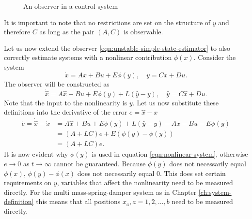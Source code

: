 \begin{figure}[ht]
    \centering
    \caption{An observer in a control system}
    \label{fig:observer-diagram}
\end{figure}

It is important to note that no restrictions are set on the structure of $y$ and therefore $C$ as long as the pair $(A,C)$ is observable. 

Let us now extend the observer \eqref{eqn:unstable-simple-state-estimator} to also correctly estimate systems with a nonlinear contribution $\phi(x)$. Consider the system
\begin{equation*}\label{eqn:nonlinear-system}
    \dot{x} = Ax + Bu + E\phi(y), \quad y = Cx + Du.
\end{equation*}
The observer will be constructed as
\begin{equation}\label{eqn:nonlinear-single-observer}
    \dot{\hat{x}} = A\hat{x} + Bu + E\phi(y) + L(\hat{y} - y), \quad \hat{y} = C\hat{x} + Du.
\end{equation}
Note that the input to the nonlinearity is $y$. Let us now substitute these definitions into the derivative of the error $e=\hat{x}-x$
\begin{equation*}\label{eqn:errror-nonlinear-observer}
    \begin{split}
        \dot{e} = \dot{\hat{x}} - \dot{x} &= A\hat{x} + Bu + E\phi(y) + L(\hat{y} - y) - Ax - Bu - E\phi(y) \\
        &= (A+LC)e + E(\phi(y) - \phi(y)) \\
        &= (A+LC)e.
    \end{split}
\end{equation*}
It is now evident why $\phi(y)$ is used in equation \eqref{eqn:nonlinear-system}, otherwise $e \rightarrow 0$ as $t \rightarrow \infty$ cannot be guaranteed. Because $\phi(y)$ does not necessarily equal $\phi(x)$, $\phi(y) - \phi(x)$ does not necessarily equal $0$. This does set certain requirements on $y$, variables that affect the nonlinearity need to be measured directly. For the multi mass-spring-damper system as in Chapter \ref{ch:system-definition} this means that all positions $x_a,a=1,2,\dots,b$ need to be measured directly. 

